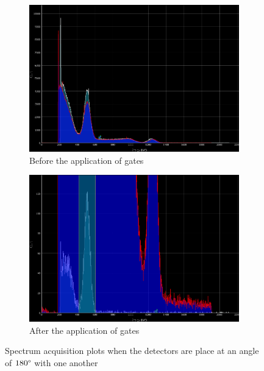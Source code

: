 \documentclass[%
 reprint,
nofootinbib,
 amsmath,amssymb,
 aps,
floatfix,
]{revtex4-2}
\begin{document}
    \begin{figure}
        \centering
        \begin{subfigure}[b]{0.5\textwidth}
            \centering
            \includegraphics[scale = 0.35]{Figures/spectrum_acquisition_180.png}
            \caption{Before the application of gates}
            \label{fig:180spec}
        \end{subfigure}
        \hfill
        \begin{subfigure}[b]{0.5\textwidth}
            \centering
            \includegraphics[scale = 0.35]{Figures/after_gate_180.png}
            \caption{After the application of gates}
            \label{fig:180gate}
        \end{subfigure}
            \caption{Spectrum acquisition plots when the detectors are place at an angle of $180 \degree$ with one another}
            \label{fig:180}
    \end{figure}
\end{document}
